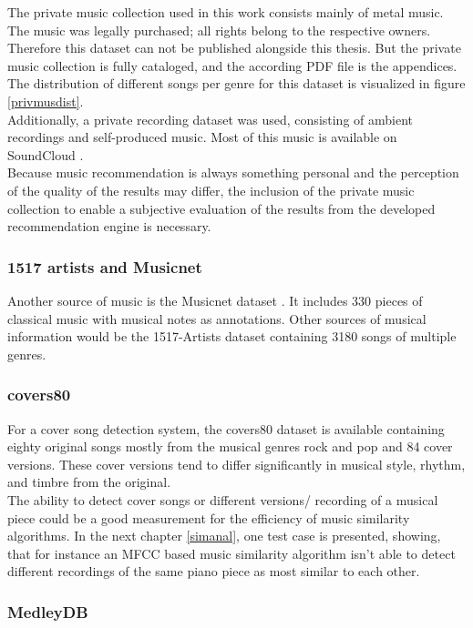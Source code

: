 The private music collection used in this work consists mainly of metal music. The music was legally purchased; all rights belong to the respective owners. Therefore this dataset can not be published alongside this thesis. But the private music collection is fully cataloged, and the according PDF file is the appendices.
The distribution of different songs per genre for this dataset is visualized in figure \ref{privmusdist}.\\
\noindent Additionally, a private recording dataset was used, consisting of ambient recordings and self-produced music. Most of this music is available on SoundCloud \cite{bqpd1}.\\
Because music recommendation is always something personal and the perception of the quality of the results may differ, the inclusion of the private music collection to enable a subjective evaluation of the results from the developed recommendation engine is necessary.


\subsubsection{1517 artists and Musicnet}

Another source of music is the Musicnet dataset \cite{musicnet1}. It includes 330 pieces of classical music with musical notes as annotations. Other sources of musical information would be the 1517-Artists dataset containing 3180 songs of multiple genres. \cite{1517artists1}

\subsubsection{covers80}\label{cov801}

For a cover song detection system, the covers80 dataset is available \cite{cover80} containing eighty original songs mostly from the musical genres rock and pop and 84 cover versions. These cover versions tend to differ significantly in musical style, rhythm, and timbre from the original.\\
The ability to detect cover songs or different versions/ recording of a musical piece could be a good measurement for the efficiency of music similarity algorithms. In the next chapter \ref{simanal}, one test case is presented, showing, that for instance an MFCC based music similarity algorithm isn't able to detect different recordings of the same piano piece as most similar to each other. 

\subsubsection{MedleyDB}

